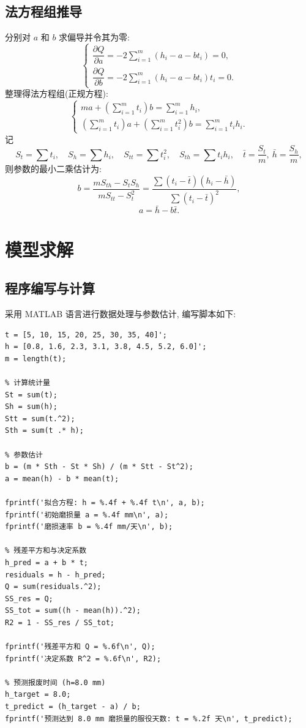 \documentclass[12pt,a4paper]{ctexart}
\begin{document}
\subsection{法方程组推导}
分别对 $a$ 和 $b$ 求偏导并令其为零: 
\[
\begin{cases}
\dfrac{\partial Q}{\partial a} = -2\sum\limits_{i=1}^{m}(h_i - a - bt_i) = 0, \\[8pt]
\dfrac{\partial Q}{\partial b} = -2\sum\limits_{i=1}^{m}(h_i - a - bt_i)t_i = 0.
\end{cases}
\]
整理得法方程组(正规方程): 
\begin{equation}
\begin{cases}
m a + \left(\sum\limits_{i=1}^{m} t_i\right) b = \sum\limits_{i=1}^{m} h_i, \\[8pt]
\left(\sum\limits_{i=1}^{m} t_i\right) a + \left(\sum\limits_{i=1}^{m} t_i^2\right) b = \sum\limits_{i=1}^{m} t_i h_i.
\end{cases}
\end{equation}
记
\[
S_t = \sum t_i,\quad S_h = \sum h_i,\quad S_{tt} = \sum t_i^2,\quad S_{th} = \sum t_i h_i,\quad \bar{t}=\frac{S_t}{m},\ \bar{h}=\frac{S_h}{m},
\]
则参数的最小二乘估计为: 
\begin{equation}
b = \frac{m S_{th} - S_t S_h}{m S_{tt} - S_t^2} = \frac{\sum (t_i-\bar{t})(h_i-\bar{h})}{\sum (t_i-\bar{t})^2},
\end{equation}
\begin{equation}
a = \bar{h} - b \bar{t}.
\end{equation}

\section{模型求解}

\subsection{程序编写与计算}
采用 MATLAB 语言进行数据处理与参数估计, 编写脚本如下: 
\begin{lstlisting}[caption={线性回归求解代码}]
% 原始数据
t = [5, 10, 15, 20, 25, 30, 35, 40]';
h = [0.8, 1.6, 2.3, 3.1, 3.8, 4.5, 5.2, 6.0]';
m = length(t);

% 计算统计量
St = sum(t);
Sh = sum(h);
Stt = sum(t.^2);
Sth = sum(t .* h);

% 参数估计
b = (m * Sth - St * Sh) / (m * Stt - St^2);
a = mean(h) - b * mean(t);

fprintf('拟合方程: h = %.4f + %.4f t\n', a, b);
fprintf('初始磨损量 a = %.4f mm\n', a);
fprintf('磨损速率 b = %.4f mm/天\n', b);

% 残差平方和与决定系数
h_pred = a + b * t;
residuals = h - h_pred;
Q = sum(residuals.^2);
SS_res = Q;
SS_tot = sum((h - mean(h)).^2);
R2 = 1 - SS_res / SS_tot;

fprintf('残差平方和 Q = %.6f\n', Q);
fprintf('决定系数 R^2 = %.6f\n', R2);

% 预测报废时间 (h=8.0 mm)
h_target = 8.0;
t_predict = (h_target - a) / b;
fprintf('预测达到 8.0 mm 磨损量的服役天数: t = %.2f 天\n', t_predict);
\end{lstlisting}
\end{document}

